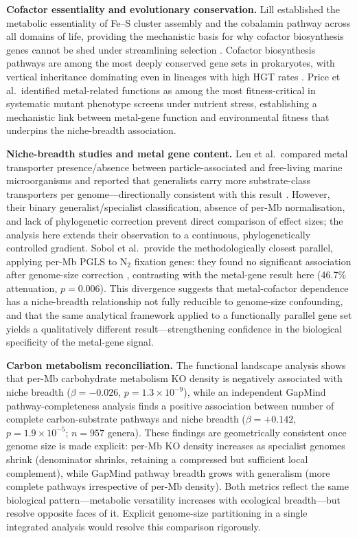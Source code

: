 \documentclass[times]{zHenriquesLab-StyleBioRxiv}
\begin{document}
\textbf{Cofactor essentiality and evolutionary conservation.} Lill established the metabolic essentiality of Fe--S cluster assembly and the cobalamin pathway across all domains of life, providing the mechanistic basis for why cofactor biosynthesis genes cannot be shed under streamlining selection \cite{lill2009}. Cofactor biosynthesis pathways are among the most deeply conserved gene sets in prokaryotes, with vertical inheritance dominating even in lineages with high HGT rates \cite{lill2009,braymer2020,mettert2015}. Price et al.\ identified metal-related functions as among the most fitness-critical in systematic mutant phenotype screens under nutrient stress, establishing a mechanistic link between metal-gene function and environmental fitness \cite{price2018} that underpins the niche-breadth association.

\textbf{Niche-breadth studies and metal gene content.} Leu et al.\ compared metal transporter presence/absence between particle-associated and free-living marine microorganisms and reported that generalists carry more substrate-class transporters per genome---directionally consistent with this result \cite{leu2022}. However, their binary generalist/specialist classification, absence of per-Mb normalisation, and lack of phylogenetic correction prevent direct comparison of effect sizes; the analysis here extends their observation to a continuous, phylogenetically controlled gradient. Sobol et al.\ provide the methodologically closest parallel, applying per-Mb PGLS to N$_2$ fixation genes: they found no significant association after genome-size correction \cite{sobol2026}, contrasting with the metal-gene result here (46.7\% attenuation, $p = 0.006$). This divergence suggests that metal-cofactor dependence has a niche-breadth relationship not fully reducible to genome-size confounding, and that the same analytical framework applied to a functionally parallel gene set yields a qualitatively different result---strengthening confidence in the biological specificity of the metal-gene signal.

\textbf{Carbon metabolism reconciliation.} The functional landscape analysis shows that per-Mb carbohydrate metabolism KO density is negatively associated with niche breadth ($\beta = -0.026$, $p = 1.3 \times 10^{-9}$), while an independent GapMind pathway-completeness analysis finds a positive association between number of complete carbon-substrate pathways and niche breadth ($\beta = +0.142$, $p = 1.9 \times 10^{-5}$; $n = 957$ genera). These findings are geometrically consistent once genome size is made explicit: per-Mb KO density increases as specialist genomes shrink (denominator shrinks, retaining a compressed but sufficient local complement), while GapMind pathway breadth grows with generalism (more complete pathways irrespective of per-Mb density). Both metrics reflect the same biological pattern---metabolic versatility increases with ecological breadth---but resolve opposite faces of it. Explicit genome-size partitioning in a single integrated analysis would resolve this comparison rigorously.
\end{document}
